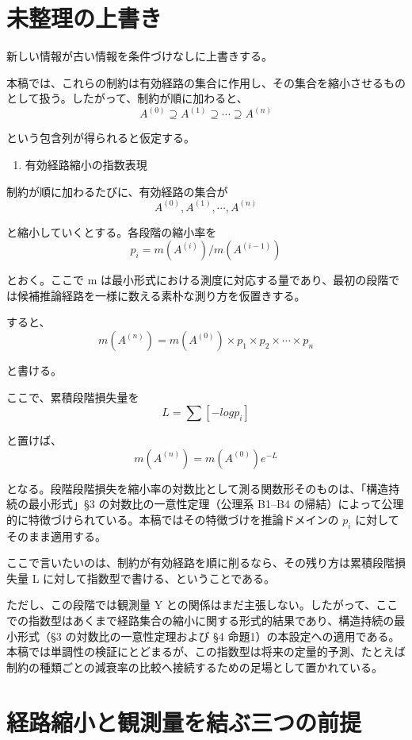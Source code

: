 \documentclass[12pt,a4paper]{article}
\begin{document}
\section{未整理の上書き}\label{ux672aux6574ux7406ux306eux4e0aux66f8ux304d}

新しい情報が古い情報を条件づけなしに上書きする。

本稿では、これらの制約は有効経路の集合に作用し、その集合を縮小させるものとして扱う。したがって、制約が順に加わると、 \[
A^{(0)} \supseteq A^{(1)} \supseteq \cdots \supseteq A^{(n)}
\]

という包含列が得られると仮定する。

\begin{enumerate}
\def\labelenumi{\arabic{enumi}.}
\setcounter{enumi}{4}
\tightlist
\item
  有効経路縮小の指数表現
\end{enumerate}

制約が順に加わるたびに、有効経路の集合が \[
A^{(0)}, A^{(1)}, \cdots, A^{(n)}
\]

と縮小していくとする。各段階の縮小率を \[
p_{i} = m(A^{(i)}) / m(A^{(i-1)})
\]

とおく。ここで m は最小形式における測度に対応する量であり、最初の段階では候補推論経路を一様に数える素朴な測り方を仮置きする。

すると、 \[
m(A^{(n)}) = m(A^{(0)}) \times p_1 \times p_2 \times \cdots \times p_{n}
\]

と書ける。

ここで、累積段階損失量を \[
L = \sum[-log p_{i}]
\]

と置けば、 \[
m(A^{(n)}) = m(A^{(0)}) e^{-L}
\]

となる。段階段階損失を縮小率の対数比として測る関数形そのものは、「構造持続の最小形式」§3 の対数比の一意性定理（公理系 B1--B4 の帰結）によって公理的に特徴づけられている。本稿ではその特徴づけを推論ドメインの \(p_{i}\) に対してそのまま適用する。

ここで言いたいのは、制約が有効経路を順に削るなら、その残り方は累積段階損失量 L に対して指数型で書ける、ということである。

ただし、この段階では観測量 Y との関係はまだ主張しない。したがって、ここでの指数型はあくまで経路集合の縮小に関する形式的結果であり、構造持続の最小形式（§3 の対数比の一意性定理および §4 命題1）の本設定への適用である。本稿では単調性の検証にとどまるが、この指数型は将来の定量的予測、たとえば制約の種類ごとの減衰率の比較へ接続するための足場として置かれている。

\section{経路縮小と観測量を結ぶ三つの前提}\label{ux7d4cux8defux7e2eux5c0fux3068ux89b3ux6e2cux91cfux3092ux7d50ux3076ux4e09ux3064ux306eux524dux63d0}
\end{document}
